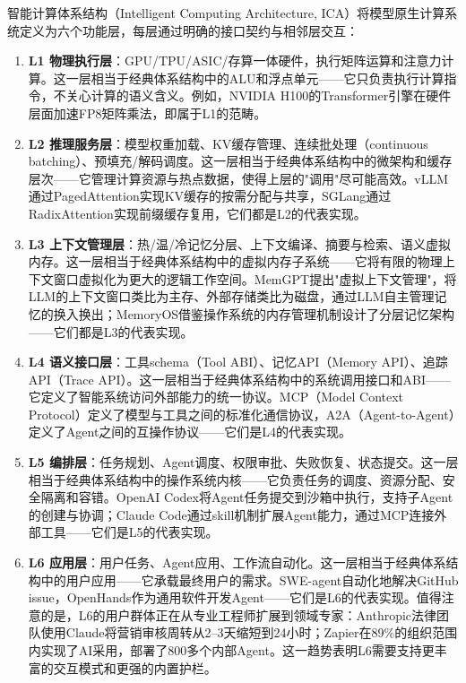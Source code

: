 \begin{definition}
智能计算体系结构（Intelligent Computing Architecture, ICA）将模型原生计算系统定义为六个功能层，每层通过明确的接口契约与相邻层交互：
\begin{enumerate}[nosep]
\item \textbf{L1 物理执行层}：GPU/TPU/ASIC/存算一体硬件，执行矩阵运算和注意力计算。这一层相当于经典体系结构中的ALU和浮点单元——它只负责执行计算指令，不关心计算的语义含义。例如，NVIDIA H100的Transformer引擎在硬件层面加速FP8矩阵乘法，即属于L1的范畴。

\item \textbf{L2 推理服务层}：模型权重加载、KV缓存管理、连续批处理（continuous batching）、预填充/解码调度。这一层相当于经典体系结构中的微架构和缓存层次——它管理计算资源与热点数据，使得上层的"调用"尽可能高效。vLLM通过PagedAttention实现KV缓存的按需分配与共享\cite{kwon2023pagedattention}，SGLang通过RadixAttention实现前缀缓存复用\cite{sglang2024}，它们都是L2的代表实现。

\item \textbf{L3 上下文管理层}：热/温/冷记忆分层、上下文编译、摘要与检索、语义虚拟内存。这一层相当于经典体系结构中的虚拟内存子系统——它将有限的物理上下文窗口虚拟化为更大的逻辑工作空间。MemGPT提出"虚拟上下文管理"，将LLM的上下文窗口类比为主存、外部存储类比为磁盘，通过LLM自主管理记忆的换入换出\cite{memgpt2023}；MemoryOS借鉴操作系统的内存管理机制设计了分层记忆架构\cite{memoryos2025}——它们都是L3的代表实现。

\item \textbf{L4 语义接口层}：工具schema（Tool ABI）、记忆API（Memory API）、追踪API（Trace API）。这一层相当于经典体系结构中的系统调用接口和ABI——它定义了智能系统访问外部能力的统一协议。MCP（Model Context Protocol）定义了模型与工具之间的标准化通信协议\cite{mcp_intro_2026}，A2A（Agent-to-Agent）定义了Agent之间的互操作协议\cite{agentprotocols2025}——它们是L4的代表实现。

\item \textbf{L5 编排层}：任务规划、Agent调度、权限审批、失败恢复、状态提交。这一层相当于经典体系结构中的操作系统内核——它负责任务的调度、资源分配、安全隔离和容错。OpenAI Codex将Agent任务提交到沙箱中执行，支持子Agent的创建与协调\cite{openai_codex_overview_2026}；Claude Code通过skill机制扩展Agent能力，通过MCP连接外部工具\cite{anthropic_claudecode_overview_2026,anthropic_claudecode_skills_2026}——它们是L5的代表实现。

\item \textbf{L6 应用层}：用户任务、Agent应用、工作流自动化。这一层相当于经典体系结构中的用户应用——它承载最终用户的需求。SWE-agent自动化地解决GitHub issue\cite{sweagent2024}，OpenHands作为通用软件开发Agent\cite{openhands_paper_2025}——它们是L6的代表实现。值得注意的是，L6的用户群体正在从专业工程师扩展到领域专家：Anthropic法律团队使用Claude将营销审核周转从2--3天缩短到24小时；Zapier在89\%的组织范围内实现了AI采用，部署了800多个内部Agent\cite{anthropic2026agenticreport}。这一趋势表明L6需要支持更丰富的交互模式和更强的内置护栏。
\end{enumerate}
\end{definition}


